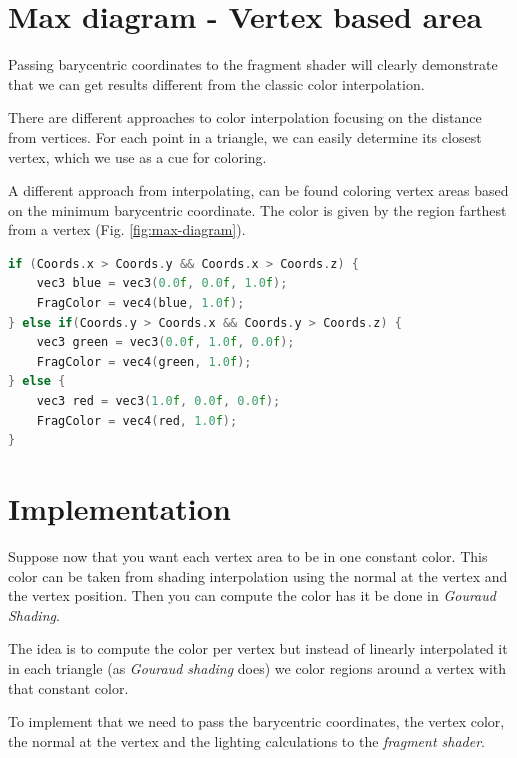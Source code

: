 \section{Max diagram - Vertex based area}
Passing barycentric coordinates to the fragment shader will clearly demonstrate that we can get results different from the classic color interpolation.

There are different approaches to color interpolation focusing on the distance from vertices. For each point in a triangle, we can easily determine its closest vertex, which we use as a cue for coloring.

A different approach from interpolating, can be found coloring vertex areas based on the minimum barycentric coordinate.
The color is given by the region farthest from a vertex (Fig. \ref{fig:max-diagram}).

\begin{lstlisting}[language=C++,
    directivestyle={\color{black}}
    emph={int,char,double,float,unsigned},
    emphstyle={\color{blue}}
   ]
if (Coords.x > Coords.y && Coords.x > Coords.z) {
    vec3 blue = vec3(0.0f, 0.0f, 1.0f);
    FragColor = vec4(blue, 1.0f);
} else if(Coords.y > Coords.x && Coords.y > Coords.z) {
    vec3 green = vec3(0.0f, 1.0f, 0.0f);
    FragColor = vec4(green, 1.0f);
} else {
    vec3 red = vec3(1.0f, 0.0f, 0.0f);
    FragColor = vec4(red, 1.0f);
}
\end{lstlisting}

\section{Implementation}
Suppose now that you want each vertex area to be in one constant color. This color can be taken from shading interpolation using the normal at the vertex and the vertex position. Then you can compute the color has it be done in \textit{Gouraud Shading}.

The idea is to compute the color per vertex but instead of linearly interpolated it in each triangle (as \textit{Gouraud shading} does) we color regions around a vertex with that constant color.

To implement that we need to pass the barycentric coordinates, the vertex color, the normal at the vertex and the lighting calculations to the \textit{fragment shader}.

